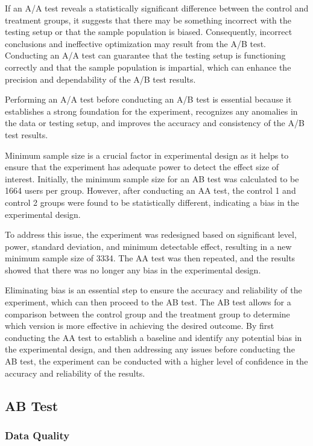 \documentclass{article}
\begin{document}
If an A/A test reveals a statistically significant difference between the control and treatment groups, it suggests that there may be something incorrect with the testing setup or that the sample population is biased. Consequently, incorrect conclusions and ineffective optimization may result from the A/B test. Conducting an A/A test can guarantee that the testing setup is functioning correctly and that the sample population is impartial, which can enhance the precision and dependability of the A/B test results.

Performing an A/A test before conducting an A/B test is essential because it establishes a strong foundation for the experiment, recognizes any anomalies in the data or testing setup, and improves the accuracy and consistency of the A/B test results.

Minimum sample size is a crucial factor in experimental design as it helps to ensure that the experiment has adequate power to detect the effect size of interest. Initially, the minimum sample size for an AB test was calculated to be 1664 users per group. However, after conducting an AA test, the control 1 and control 2 groups were found to be statistically different, indicating a bias in the experimental design.

To address this issue, the experiment was redesigned based on significant level, power, standard deviation, and minimum detectable effect, resulting in a new minimum sample size of 3334. The AA test was then repeated, and the results showed that there was no longer any bias in the experimental design.

Eliminating bias is an essential step to ensure the accuracy and reliability of the experiment, which can then proceed to the AB test. The AB test allows for a comparison between the control group and the treatment group to determine which version is more effective in achieving the desired outcome. By first conducting the AA test to establish a baseline and identify any potential bias in the experimental design, and then addressing any issues before conducting the AB test, the experiment can be conducted with a higher level of confidence in the accuracy and reliability of the results.

\subsection*{AB Test} 

\subsubsection*{Data Quality} 
\end{document}

